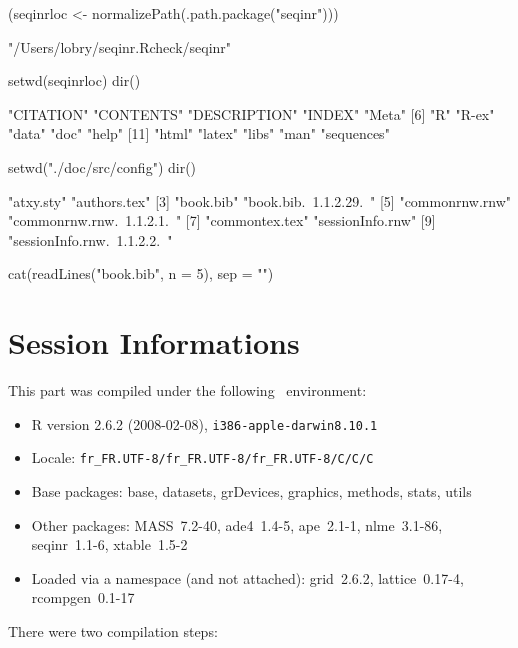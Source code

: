 \documentclass{article}
\begin{document}
\begin{Schunk}
\begin{Sinput}
 (seqinrloc <- normalizePath(.path.package("seqinr")))
\end{Sinput}
\begin{Soutput}
[1] "/Users/lobry/seqinr.Rcheck/seqinr"
\end{Soutput}
\begin{Sinput}
 setwd(seqinrloc)
 dir()
\end{Sinput}
\begin{Soutput}
 [1] "CITATION"    "CONTENTS"    "DESCRIPTION" "INDEX"       "Meta"       
 [6] "R"           "R-ex"        "data"        "doc"         "help"       
[11] "html"        "latex"       "libs"        "man"         "sequences"  
\end{Soutput}
\begin{Sinput}
 setwd("./doc/src/config")
 dir()
\end{Sinput}
\begin{Soutput}
[1] "atxy.sty"                   "authors.tex"               
[3] "book.bib"                   "book.bib.~1.1.2.29.~"      
[5] "commonrnw.rnw"              "commonrnw.rnw.~1.1.2.1.~"  
[7] "commontex.tex"              "sessionInfo.rnw"           
[9] "sessionInfo.rnw.~1.1.2.2.~"
\end{Soutput}
\begin{Sinput}
 cat(readLines("book.bib", n = 5), sep = "\n")
\end{Sinput}
\begin{Soutput}
@incollection{seqinr,
    author = {Charif, D. and Lobry, J.R.},
    title = {Seqin{R} 1.0-2: a contributed package to the {R} project for statistical computing devoted to biological sequences retrieval and analysis.},
    booktitle = {Structural approaches to sequence evolution: Molecules, networks, populations},
    year = {2007},
\end{Soutput}
\end{Schunk}

%
%


\section*{Session Informations}

This part was compiled under the following \Rlogo{}~environment:

\begin{itemize}
  \item R version 2.6.2 (2008-02-08), \verb|i386-apple-darwin8.10.1|
  \item Locale: \verb|fr_FR.UTF-8/fr_FR.UTF-8/fr_FR.UTF-8/C/C/C|
  \item Base packages: base, datasets, grDevices, graphics, methods,
    stats, utils
  \item Other packages: MASS~7.2-40, ade4~1.4-5, ape~2.1-1,
    nlme~3.1-86, seqinr~1.1-6, xtable~1.5-2
  \item Loaded via a namespace (and not attached): grid~2.6.2,
    lattice~0.17-4, rcompgen~0.1-17
\end{itemize}
There were two compilation steps:
\end{document}
